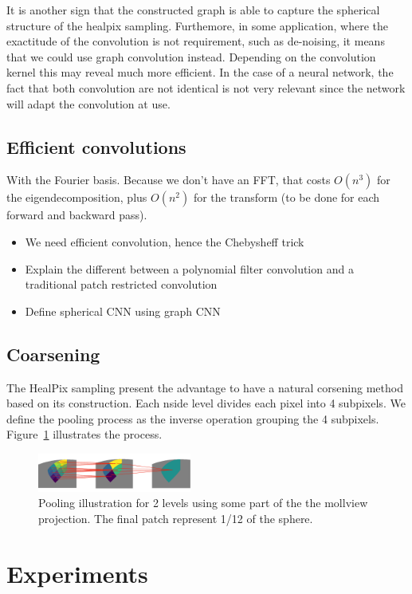 \documentclass[final,twocolumn,3p,times,authoryear]{elsarticle}
\newcommand{\assign}[1]{{\color[rgb]{.8,.5,.8}{Assigned: #1 }}}
\newcommand{\1}{\b{1}}              %
\newcommand{\0}{\b{0}}              %
\begin{document}
It is another sign that the constructed graph is able to capture the spherical
structure of the healpix sampling. Furthemore, in some application, where the
exactitude of the convolution is not requirement, such as de-noising, it means
that we could use graph convolution instead. Depending on the convolution kernel
this may reveal much more efficient. In the case of a neural network, the fact
that both convolution are not identical is not very relevant since the network
will adapt the convolution at use.

\subsection{Efficient convolutions}
\assign{Michaël}
With the Fourier basis. Because we don't have an FFT, that costs $O(n^3)$ for the eigendecomposition, plus $O(n^2)$ for the transform (to be done for each forward and backward pass).
\begin{itemize}
	\item We need efficient convolution, hence the Chebysheff trick
	\item Explain the different between a polynomial filter convolution and a traditional patch restricted convolution
	\item Define spherical CNN using graph CNN
\end{itemize}


\subsection{Coarsening}
The HealPix sampling present the advantage to have a natural corsening method
based on its construction. Each nside level divides each pixel into 4 subpixels.
We define the pooling process as the inverse operation grouping the 4 subpixels.
Figure~\ref{fig:pooling} illustrates the process.
\begin{figure}[!ht]
\centering
\includegraphics[width=0.45\textwidth]{figures/pooling.pdf}
\caption{Pooling illustration for 2 levels using some part of the the mollview projection. 
The final patch represent 1/12 of the sphere.}
\label{fig:pooling}
\end{figure}


\section{Experiments}
\end{document}
